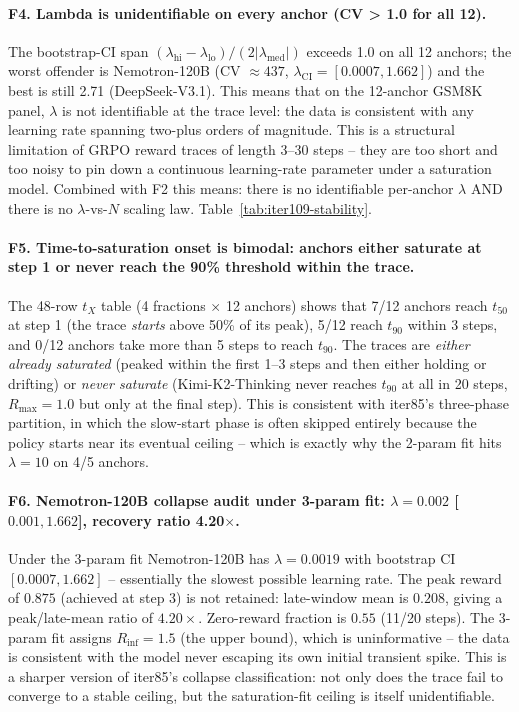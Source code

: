 \paragraph{F4. Lambda is unidentifiable on every anchor (CV > 1.0 for all 12).}
The bootstrap-CI span $(\lambda_\mathrm{hi} - \lambda_\mathrm{lo}) / (2 |\lambda_\mathrm{med}|)$ exceeds 1.0 on all 12 anchors; the worst offender is Nemotron-120B (CV $\approx 437$, $\lambda_\mathrm{CI} = [0.0007, 1.662]$) and the best is still 2.71 (DeepSeek-V3.1).  This means that on the 12-anchor GSM8K panel, $\lambda$ is not identifiable at the trace level: the data is consistent with any learning rate spanning two-plus orders of magnitude.  This is a structural limitation of GRPO reward traces of length 3--30 steps -- they are too short and too noisy to pin down a continuous learning-rate parameter under a saturation model.  Combined with F2 this means: there is no identifiable per-anchor $\lambda$ AND there is no $\lambda$-vs-$N$ scaling law.  Table~\ref{tab:iter109-stability}.

\paragraph{F5. Time-to-saturation onset is bimodal: anchors either saturate at step 1 or never reach the 90\% threshold within the trace.}
The 48-row $t_X$ table (4 fractions $\times$ 12 anchors) shows that 7/12 anchors reach $t_{50}$ at step 1 (the trace \emph{starts} above 50\% of its peak), 5/12 reach $t_{90}$ within 3 steps, and 0/12 anchors take more than 5 steps to reach $t_{90}$.  The traces are \emph{either already saturated} (peaked within the first 1--3 steps and then either holding or drifting) or \emph{never saturate} (Kimi-K2-Thinking never reaches $t_{90}$ at all in 20 steps, $R_\mathrm{max} = 1.0$ but only at the final step).  This is consistent with iter85's three-phase partition, in which the slow-start phase is often skipped entirely because the policy starts near its eventual ceiling -- which is exactly why the 2-param fit hits $\lambda = 10$ on 4/5 anchors.

\paragraph{F6. Nemotron-120B collapse audit under 3-param fit: $\lambda = 0.002$ [$0.001, 1.662$], recovery ratio 4.20$\times$.}
Under the 3-param fit Nemotron-120B has $\lambda = 0.0019$ with bootstrap CI $[0.0007, 1.662]$ -- essentially the slowest possible learning rate.  The peak reward of $0.875$ (achieved at step 3) is not retained: late-window mean is $0.208$, giving a peak/late-mean ratio of $4.20\times$.  Zero-reward fraction is $0.55$ (11/20 steps).  The 3-param fit assigns $R_\mathrm{inf} = 1.5$ (the upper bound), which is uninformative -- the data is consistent with the model never escaping its own initial transient spike.  This is a sharper version of iter85's collapse classification: not only does the trace fail to converge to a stable ceiling, but the saturation-fit ceiling is itself unidentifiable.

